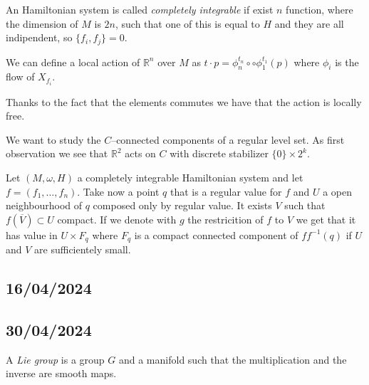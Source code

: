 \documentclass[misc]{subfiles}
\begin{document}
\begin{Dfn}
    An Hamiltonian system is called \textit{completely integrable} if exist $n$ function, where the dimension of $M$ is $2n$, such that one of this is equal to $H$ and they are all indipendent, so $\{f_i,f_j\}=0$.

    We can define a local action of $\mathbb{R}^n$ over $M$ as $t \cdot p=\phi_n^{t_n} \circ \circ \phi_1^{t_1}(p)$ where $\phi_i$ is the flow of $X_{f_i}$.
\end{Dfn}

\begin{Prp}
    Thanks to the fact that the elements commutes we have that the action is locally free.
\end{Prp}

\begin{Exp}
    We want to study the $C$--connected components of a regular level set. As first observation we see that $\mathbb{R}^2$ acts on $C$ with discrete stabilizer $\{0\} \times 2^k$.

    Let $(M,\omega,H)$ a completely integrable Hamiltonian system and let $f=(f_1,\dots,f_n)$. Take now a point $q$ that is a regular value for $f$ and $U$ a open neighbourhood of $q$ composed only by regular value. It exists $V$ such that $f(\overline{V}) \subset U$ compact. If we denote with $g$ the restricition of $f$ to $V$ we get that it has value in $U \times F_q$ where $F_q$ is a compact connected component of $ff^{-1}(q)$ if $U$ and $V$ are sufficientely small.
\end{Exp}

\subsection*{16/04/2024}

\subsection*{30/04/2024}

\begin{Dfn}\label{Dfn: Lie group}
    A \emph{Lie group} is a group $G$ and a manifold such that the multiplication and the inverse are smooth maps.
\end{Dfn}
\end{document}
